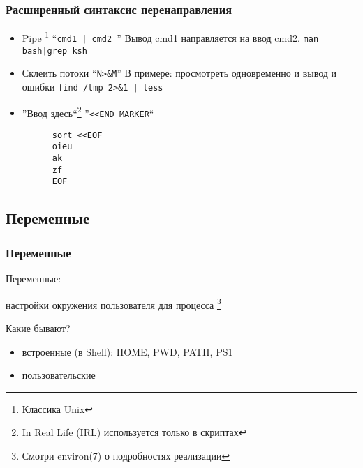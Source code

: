 \begin{frame}[fragile]
  \frametitle{Расширенный синтаксис перенаправления}
  
  \begin{itemize}
    \item \alert{Pipe} \footnote{Классика Unix} ``\verb+cmd1 | cmd2 +'' \newline
      Вывод cmd1 направляется на ввод cmd2. \newline
      \verb+man bash|grep ksh+ \pause
    \item \alert{Склеить потоки}  ``\verb+N>&M+'' \newline
      В примере: просмотреть одновременно и вывод и ошибки \newline
      \verb+find /tmp 2>&1 | less+ \pause
    \item \alert{''Ввод здесь``}\footnote{In Real Life (IRL) используется только в скриптах} ''\verb+<<END_MARKER+`` \newline
      \begin{verbatim}
      sort <<EOF
      oieu
      ak
      zf
      EOF
      \end{verbatim}
  \end{itemize}
\end{frame}

\subsection{Переменные}

\begin{frame}[fragile]
  \frametitle{Переменные}

  \Large{\alert{Переменные:}}
  
  \normalsize{настройки окружения пользователя для процесса}
  \footnote{Смотри environ(7) о подробностях реализации} \newline

  \pause 

  \Large{\alert{Какие бывают?}}
  \normalsize{ }
  \begin{itemize}
    \item встроенные (в Shell): HOME, PWD, PATH, PS1
    \item пользовательские 
  \end{itemize} 

\end{frame}

